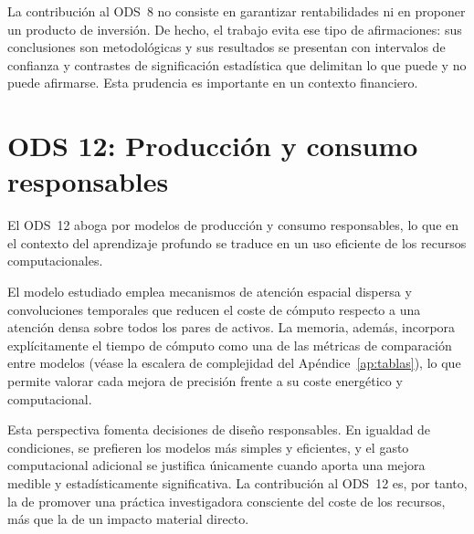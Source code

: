 La contribución al ODS~8 no consiste en garantizar rentabilidades ni en proponer un
producto de inversión. De hecho, el trabajo evita ese tipo de afirmaciones: sus
conclusiones son metodológicas y sus resultados se presentan con intervalos de
confianza y contrastes de significación estadística que delimitan lo que puede y no
puede afirmarse. Esta prudencia es importante en un contexto financiero.

\section{ODS 12: Producción y consumo responsables}\label{sec:ods12}

El ODS~12 aboga por modelos de producción y consumo responsables, lo que en el contexto
del aprendizaje profundo se traduce en un uso eficiente de los recursos
computacionales.

El modelo estudiado emplea mecanismos de atención espacial dispersa y convoluciones
temporales que reducen el coste de cómputo respecto a una atención densa sobre todos
los pares de activos. La memoria, además, incorpora explícitamente el tiempo de cómputo
como una de las métricas de comparación entre modelos (véase la escalera de complejidad
del Apéndice~\ref{ap:tablas}), lo que permite valorar cada mejora de precisión frente a
su coste energético y computacional.

Esta perspectiva fomenta decisiones de diseño responsables. En igualdad de
condiciones, se prefieren los modelos más simples y eficientes, y el gasto computacional
adicional se justifica únicamente cuando aporta una mejora medible y estadísticamente
significativa.
La contribución al ODS~12 es, por tanto, la de promover una práctica investigadora
consciente del coste de los recursos, más que la de un impacto material directo.
